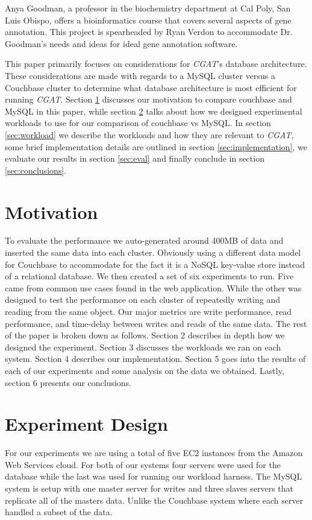 \documentclass[]{IEEEtran}
\begin{document}
Anya Goodman, a professor in the biochemistry department at Cal Poly, San Luis
Obispo, offers a bioinformatics course that covers several aspects of gene
annotation. This project is spearheaded by Ryan Verdon to accommodate Dr.
Goodman's needs and ideas for ideal gene annotation software.

This paper primarily focuses on considerations for \textit{CGAT}'s database
architecture. These considerations are made with regards to a MySQL cluster
versus a Couchbase cluster to determine what database architecture is most
efficient for running \textit{CGAT}. Section \ref{sec:motive} discusses our
motivation to compare couchbase and MySQL in this paper, while section
\ref{sec:design} talks about how we designed experimental workloads to use for
our comparison of couchbase vs MySQL. In section \ref{sec:workload} we
describe the workloads and how they are relevant to \textit{CGAT}, some brief
implementation details are outlined in section \ref{sec:implementation}, we
evaluate our results in section \ref{sec:eval} and finally conclude in
section \ref{sec:conclusions}.

\section{Motivation}\label{sec:motive}
To evaluate the performance we auto-generated around
400MB of data and inserted the same data into each cluster.  Obviously using a
different data model for Couchbase to accommodate for the fact it is a NoSQL
key-value store instead of a relational database. We then created a set of six
experiments to run. Five came from common use cases found in the web
application. While the other was designed to test the performance on each
cluster of repeatedly writing and reading from the same object. Our major
metrics are write performance, read performance, and time-delay between writes
and reads of the same data. The rest of the paper is broken down as follows.
Section 2 describes in depth how we designed the experiment. Section 3
discusses the workloads we ran on each system. Section 4 describes our
implementation.  Section 5 goes into the results of each of our experiments and
some analysis on the data we obtained. Lastly, section 6 presents our
conclusions.
 
\section{Experiment Design}\label{sec:design}
For our experiments we are using a total of five EC2 instances from the Amazon
Web Services cloud. For both of our systems four servers were used for the
database while the last was used for running our workload harness. The MySQL
system is setup with one master server for writes and three slaves servers that
replicate all of the masters data. Unlike the Couchbase system where each
server handled a subset of the data.
\end{document}

